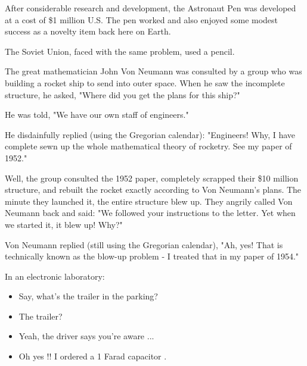 	After considerable research and development, the Astronaut Pen was developed at a cost of \$1 million U.S. The pen worked and also enjoyed some modest success as a novelty item back here on Earth.
	
	The Soviet Union, faced with the same problem, used a pencil.
	\begin{center}\underline{\hspace{5 cm}}\end{center}
	
	The great mathematician John Von Neumann was consulted by a group who was building a rocket ship to send into outer space. When he saw the incomplete structure, he asked, "Where did you get the plans for this ship?"
	
	He was told, "We have our own staff of engineers."
	
	He disdainfully replied (using the Gregorian calendar): "Engineers! Why, I have complete sewn up the whole mathematical theory of rocketry. See my paper of 1952."
	
	Well, the group consulted the 1952 paper, completely scrapped their \$10 million structure, and rebuilt the rocket exactly according to Von Neumann's plans. The minute they launched it, the entire structure blew up. They angrily called Von Neumann back and said: "We followed your instructions to the letter. Yet when we started it, it blew up! Why?"
	
	Von Neumann replied (still using the Gregorian calendar), "Ah, yes! That is technically known as the blow-up problem - I treated that in my paper of 1954."

	\begin{center}\underline{\hspace{5 cm}}\end{center}
	
	In an electronic laboratory:
	
	\begin{itemize}
		\item Say, what's the trailer in the parking?
	
		\item The trailer?
	
		\item Yeah, the driver says you're aware ...
	
		\item Oh yes !! I ordered a 1 Farad capacitor .
	\end{itemize}

	\begin{center}\underline{\hspace{5 cm}}\end{center}
	
